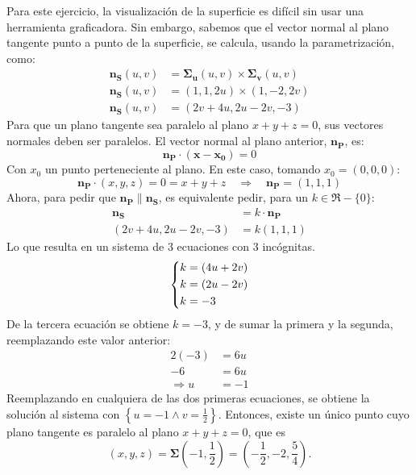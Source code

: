 \begin{solution}
Para este ejercicio, la visualización de la superficie es difícil sin usar una herramienta graficadora.
Sin embargo, sabemos que el vector normal al plano tangente punto a punto de la superficie, se calcula, usando la parametrización, como:
\begin{align*}
    \boldsymbol{n_S}(u,v)&=\boldsymbol{\Sigma_{u}}(u,v)\times \boldsymbol{\Sigma_{v}}(u,v)\\
    \boldsymbol{n_S}(u,v)&=(1,1,2u)\times(1,-2,2v)\\
    \boldsymbol{n_S}(u,v)&=(2v+4u,2u-2v,-3)
\end{align*}
Para que un plano tangente sea paralelo al plano $x+y+z=0$, sus vectores normales deben ser paralelos. El vector normal al plano anterior, $\boldsymbol{n_{P}}$, es:
\begin{equation*}
    \boldsymbol{n_{P}}\cdot \left(\boldsymbol{x}-\boldsymbol{x_{0}}\right) = 0
\end{equation*}
Con $x_0$ un punto perteneciente al plano. En este caso, tomando $x_0=(0,0,0)$:
\begin{equation*}
    \boldsymbol{n_{P}}\cdot (x,y,z) = 0 = x+y+z \quad \Rightarrow \quad \boldsymbol{n_{P}}=(1,1,1)
\end{equation*}
Ahora, para pedir que $\boldsymbol{n_{P}} \parallel \boldsymbol{n_{S}}$, es equivalente pedir, para un $k\in\Re-\{0\}$:
\begin{align*}
    \boldsymbol{n_{S}} &= k \cdot \boldsymbol{n_{P}}\\
    (2v+4u,2u-2v,-3)&= k(1,1,1)
\end{align*}
Lo que resulta en un sistema de 3 ecuaciones con 3 incógnitas.
\[\begin{dcases}
            k = (4u+2v) \\
            k = (2u-2v)         \\
            k = -3
        \end{dcases}\]
De la tercera ecuación se obtiene $k=-3$, y de sumar la primera y la segunda, reemplazando este valor anterior:
\begin{align*}
    2(-3)&=6u\\
    -6&=6u\\
    \Rightarrow u&=-1
\end{align*}
Reemplazando en cualquiera de las dos primeras ecuaciones, se obtiene la solución al sistema con $\left\{u=-1 \land v=\frac{1}{2}\right\}$. 
Entonces, existe un único punto cuyo plano tangente es paralelo al plano $x+y+z=0$, que es 
\begin{equation*}
    (x,y,z)=\boldsymbol{\Sigma}\left(-1,\frac{1}{2}\right)=\left(-\frac{1}{2},-2,\frac{5}{4}\right).    
\end{equation*}


\end{solution}

